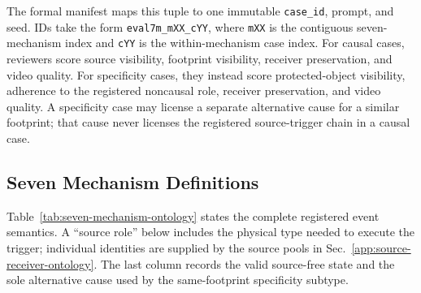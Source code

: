 The formal manifest maps this tuple to one immutable
\texttt{case\_id}, prompt, and seed.  IDs take the form
\texttt{eval7m\_mXX\_cYY}, where \texttt{mXX} is the contiguous seven-mechanism
index and \texttt{cYY} is the within-mechanism case index.  For causal cases,
reviewers score source visibility, footprint visibility, receiver
preservation, and video quality.  For specificity cases, they instead score
protected-object visibility, adherence to the registered noncausal role,
receiver preservation, and video quality.  A specificity case may license a
separate alternative cause for a similar footprint; that cause never licenses
the registered source-trigger chain in a causal case.

\subsection{Seven Mechanism Definitions}
\label{app:mechanism-definitions}

Table~\ref{tab:seven-mechanism-ontology} states the complete registered event
semantics.  A ``source role'' below includes the physical type needed to
execute the trigger; individual identities are supplied by the source pools in
Sec.~\ref{app:source-receiver-ontology}.  The last column records the valid
source-free state and the sole alternative cause used by the
same-footprint specificity subtype.

